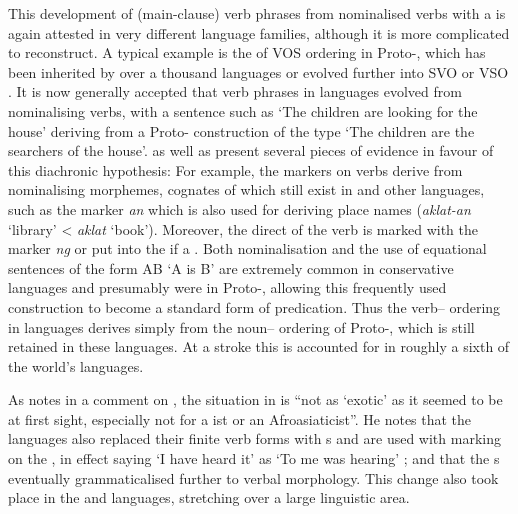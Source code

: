 \documentclass[output=paper]{langsci/langscibook}
\begin{document}
This development of (main-clause) verb phrases from nominalised verbs with a   is again attested in very different language families, although it is more complicated to reconstruct. A typical example is the  of VOS ordering in Proto-, which has been inherited by over a thousand  languages or evolved further into SVO or VSO \citep[7]{Adelaar2005}. It is now generally accepted that verb phrases in  languages evolved from nominalising verbs, with a sentence such as ‘The children are looking for the house’ deriving from a Proto- construction of the type ‘The children are the searchers of the house’. \citet{StarostaEtAl1982} as well as \citet{Kaufman2009} present several pieces of evidence in favour of this diachronic hypothesis: For example, the  markers on verbs derive from nominalising morphemes, cognates of which still exist in  and other languages, such as the   marker \textit{an} which is also used for deriving place names (\textit{aklat-an} ‘library’ < \textit{aklat} ‘book’). Moreover, the direct  of the verb is marked with the  marker \textit{ng} or put into the   if a . Both nominalisation and the use of equational sentences of the form AB ‘A is B’ are extremely common in conservative  languages and presumably were in Proto-, allowing this frequently used construction to become a standard form of predication. Thus the verb– ordering in  languages derives simply from the noun– ordering of Proto-, which is still retained in these languages. At a stroke this  is accounted for in roughly a sixth of the world’s languages.

As \citet[167]{Sasse2009} notes in a comment on \citet{Kaufman2009}, the situation in  is “not as ‘exotic’ as it seemed to be at first sight, especially not for a ist or an Afroasiaticist”. He notes that the  languages also replaced their finite verb forms with s and are used with  marking on the , in effect saying ‘I have heard it’ as ‘To me was hearing’ \citep[174]{Sasse2009}; and that the  s eventually grammaticalised further to  verbal morphology. This change also took place in the  and  languages, stretching over a large linguistic area. 
\end{document}
